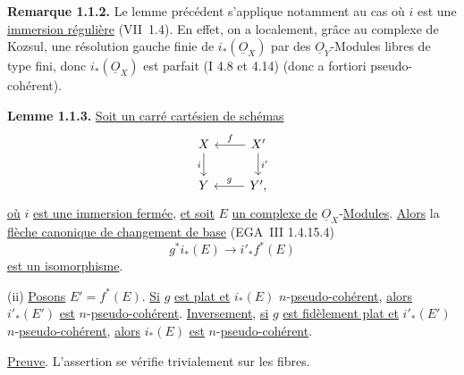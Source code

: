 \textbf{Remarque 1.1.2.} Le lemme précédent s'applique notamment au cas où \(i\) est une \uline{immersion régulière} (VII~1.4). En effet, on a localement, grâce au complexe de Kozsul, une résolution gauche finie de \(i_*(\underline{O}_X)\) par des \(\underline{O}_Y\)-Modules libres de type fini, donc \(i_*(\underline{O}_X)\) est parfait (I 4.8 et 4.14) (donc a fortiori pseudo-cohérent).

\textbf{Lemme 1.1.3.} \uline{Soit un carré cartésien de schémas}
\[
\begin{tikzcd}
X \arrow[d,"i"'] & X' \arrow[l,"f"'] \arrow[d,"i'"]\\
Y & Y'{,} \arrow[l,"g"']
\end{tikzcd}
\]
\uline{où} \(i\) \uline{est une immersion fermée}, \uline{et soit} \(E\) \uline{un complexe de} \(\underline{O}_X\)-\uline{Modules}. \uline{Alors} la \uline{flèche canonique de changement de base} (EGA~III 1.4.15.4)
\[
  g^*i_*(E)\longrightarrow i'_*f^*(E)
\]
\uline{est un isomorphisme}.

(ii) \uline{Posons} \(E'=f^*(E)\). \uline{Si} \(g\) \uline{est plat et} \(i_*(E)\) \(n\)-\uline{pseudo-cohérent}, \uline{alors} \(i'_*(E')\) \uline{est} \(n\)-\uline{pseudo-cohérent}. \uline{Inversement}, \uline{si} \(g\) \uline{est fidèlement plat et} \(i'_*(E')\) \(n\)-\uline{pseudo-cohérent}, \uline{alors} \(i_*(E)\) \uline{est} \(n\)-\uline{pseudo-cohérent}.

\uline{Preuve}. L'assertion se vérifie trivialement sur les fibres.

